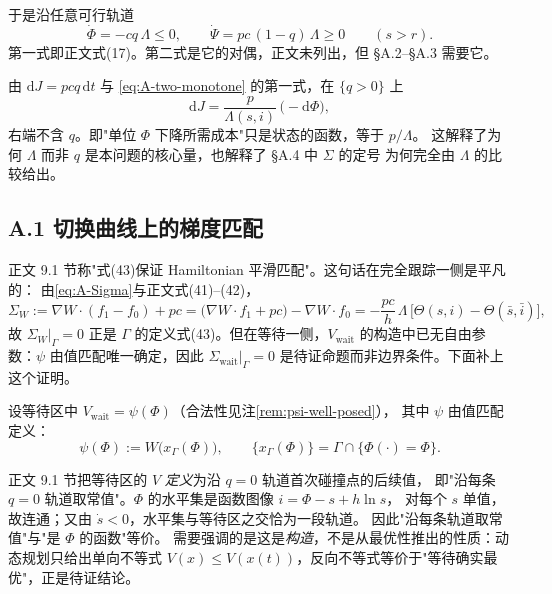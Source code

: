 于是沿任意可行轨道
\begin{equation}
  \dot\Phi=-cq\,\Lambda\le 0,
  \qquad
  \dot\Psi=pc\,(1-q)\,\Lambda\ge 0
  \qquad (s>r).
  \label{eq:A-two-monotone}
\end{equation}
第一式即正文式(17)。第二式是它的对偶，正文未列出，但 \S A.2--\S A.3 需要它。

\begin{remark}[成本的状态化表示]
由 $\mathrm{d}J=pcq\,\mathrm{d}t$ 与 \eqref{eq:A-two-monotone} 的第一式，在 $\{q>0\}$ 上
\begin{equation}
  \mathrm{d}J=\frac{p}{\Lambda(s,i)}\,\bigl(-\mathrm{d}\Phi\bigr),
  \label{eq:A-price}
\end{equation}
右端不含 $q$。即"单位 $\Phi$ 下降所需成本"只是状态的函数，等于 $p/\Lambda$。
这解释了为何 $\Lambda$ 而非 $q$ 是本问题的核心量，也解释了 \S A.4 中 $\Sigma$ 的定号
为何完全由 $\Lambda$ 的比较给出。
\end{remark}


\subsection*{A.1 切换曲线上的梯度匹配}

正文 9.1 节称"式(43)保证 Hamiltonian 平滑匹配"。这句话在完全跟踪一侧是平凡的：
由\eqref{eq:A-Sigma}与正文式(41)--(42)，
\begin{equation}
  \Sigma_W:=\nabla W\cdot(f_1-f_0)+pc
  =\bigl(\nabla W\cdot f_1+pc\bigr)-\nabla W\cdot f_0
  =-\frac{pc}{h}\,\Lambda\,\bigl[\Theta(s,i)-\Theta(\bar s,\bar i)\bigr],
  \label{eq:A-SigmaW}
\end{equation}
故 $\Sigma_W|_\Gamma=0$ 正是 $\Gamma$ 的定义式(43)。但在等待一侧，$V_{\mathrm{wait}}$
的构造中已无自由参数：$\psi$ 由值匹配唯一确定，因此
$\Sigma_{\mathrm{wait}}|_\Gamma=0$ 是待证命题而非边界条件。下面补上这个证明。

设等待区中 $V_{\mathrm{wait}}=\psi(\Phi)$（合法性见注\ref{rem:psi-well-posed}），
其中 $\psi$ 由值匹配定义：
\begin{equation}
  \psi(\Phi):=W\bigl(x_\Gamma(\Phi)\bigr),
  \qquad
  \{x_\Gamma(\Phi)\}=\Gamma\cap\{\Phi(\cdot)=\Phi\}.
  \label{eq:A-psi-def}
\end{equation}

\begin{remark}
\label{rem:psi-well-posed}
正文 9.1 节把等待区的 $V$ \emph{定义}为沿 $q=0$ 轨道首次碰撞点的后续值，
即"沿每条 $q=0$ 轨道取常值"。$\Phi$ 的水平集是函数图像 $i=\Phi-s+h\ln s$，
对每个 $s$ 单值，故连通；又由 $\dot s<0$，水平集与等待区之交恰为一段轨道。
因此"沿每条轨道取常值"与"是 $\Phi$ 的函数"等价。
需要强调的是这是\emph{构造}，不是从最优性推出的性质：动态规划只给出单向不等式
$V(x)\le V(x(t))$，反向不等式等价于"等待确实最优"，正是待证结论。
\end{remark}

